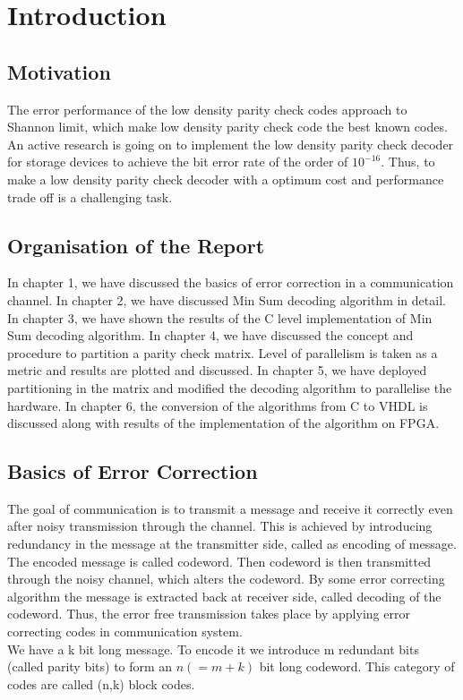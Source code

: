 
\chapter{Introduction} 
\label{Chapter1} 


\section{Motivation }
The error performance of the low density parity check  codes approach to Shannon limit, which make low density parity check code the best known codes. An active research is going on to implement the low density parity check decoder for storage devices to achieve the bit error rate of the order of $10^{-16}$. Thus, to make a low density parity check  decoder with a optimum cost and performance trade off is a challenging task.

\section{Organisation of the Report }

In chapter 1, we have discussed the basics of error correction in a communication channel. In chapter 2, we have discussed Min Sum decoding algorithm in detail. In chapter 3, we have shown the results of the C level implementation of Min Sum decoding algorithm. In chapter 4, we have discussed the concept and procedure to partition a parity check matrix. Level of parallelism is taken as a metric and results are plotted and discussed. In chapter 5, we have deployed partitioning in the matrix and modified the decoding algorithm to parallelise the hardware. In chapter 6, the conversion of the algorithms from C to VHDL is discussed along with results of the implementation of the algorithm on FPGA.
\section{Basics of Error Correction }
  
The goal of communication is to transmit a message and receive it correctly even after noisy transmission through the channel. This is achieved by introducing redundancy in the message at the transmitter side, called as encoding of message. The encoded message is called codeword. Then codeword is then transmitted through the noisy channel, which alters the codeword. By some error correcting algorithm the message is extracted back at receiver side, called decoding of the codeword. Thus, the error free transmission takes place by applying error correcting codes in communication system.\\
We have a k bit long message. To encode it we introduce m redundant bits (called parity bits) to form an $n(=m+k)$ bit long codeword. This category of codes are called (n,k) block codes. 


